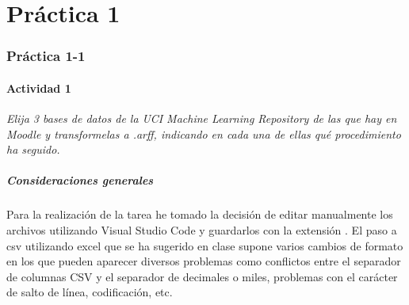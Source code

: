 \part{Práctica 1}
\section{Práctica 1-1}\label{p11}
\subsection{Actividad 1}\label{p11a1}
\begin{center}
    \parbox{12cm}{\justify\textit{
        Elija 3 bases de datos de la UCI Machine Learning Repository de las que hay en Moodle y transformelas a .arff, indicando en cada una de ellas qué procedimiento ha seguido.
    }}
\end{center}

\subsubsection{Consideraciones generales}\label{ssc:consideraciones-generales}
Para la realización de la tarea he tomado la decisión de editar manualmente los archivos utilizando Visual Studio Code y guardarlos con la extensión . El paso a csv utilizando excel que se ha sugerido en clase supone varios cambios de formato en los que pueden aparecer diversos problemas como conflictos entre el separador de columnas CSV y el separador de decimales o miles, problemas con el carácter de salto de línea, codificación, etc.

